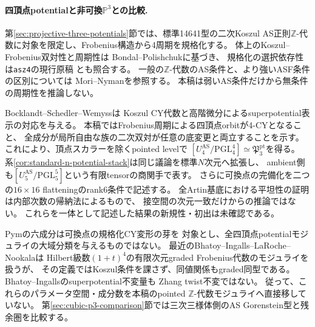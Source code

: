 \documentclass[11pt,a4paper]{ltjsarticle}
\numberwithin{equation}{section}
\newcommand{\PP}{\mathbb P}
\newcommand{\PGL}{\mathrm{PGL}}
\begin{document}
\paragraph{四頂点potentialと非可換$\PP^3$との比較.}
第\ref{sec:projective-three-potentials}節では、標準14641型の二次Koszul
AS正則$\mathbb Z$-代数に対象を限定し、Frobenius構造から4周期を規格化する。
体上のKoszul--Frobenius双対性と周期性は
Bondal--Polishchuk\cite{PBondalPolishchukHelices}に基づき、
規格化の選択依存性は\texttt{asz4}の現行原稿
\cite{ASZ4Canonical}とも照合する。
一般の$\mathbb Z$-代数のAS条件と、より強いASF条件の区別については
Mori--Nyman\cite[Theorem~4.19 and Lemma~5.24]{MoriNymanZ}を参照する。
本稿は弱いAS条件だけから無条件の周期性を推論しない。

Bocklandt--Schedler--Wemyss\cite[Theorem~6.2]{BSWPotentials}は
Koszul CY代数と高階微分によるsuperpotential表示の対応を与える。
本稿ではFrobenius周期による四頂点orbitが4-CYとなること、
全成分が局所自由な族の二次双対が任意の底変更と両立することを示す。
これにより、頂点スカラーを除くpointed levelで
$[U_4^{\mathrm{AS}}/\PGL_4^4]\simeq\mathfrak P_3^{\mathrm{pt}}$を得る。
系\ref{cor:standard-n-potential-stack}は同じ議論を標準$N$次元へ拡張し、
ambient側も$[U_5^{\mathrm{AS}}/\PGL_5^5]$という有限tensorの商関手で表す。
さらに可換点の完備化を二つの$16\times16$ flatteningのrank6条件で記述する。
全Artin基底における平坦性の証明は内部次数の帰納法によるもので、
接空間の次元一致だけからの推論ではない。
これらを一体として記述した結果の新規性・初出は未確認である。

Pym\cite[Theorem~1.1 and \S2.2]{Pym}の六成分は可換点の規格化CY変形の芽を
対象とし、全四頂点potentialモジュライの大域分類を与えるものではない。
最近のBhatoy--Ingalls--LaRoche--Nookala\cite[\S2.3]{BILNComponents}は
Hilbert級数$(1+t)^4$の有限次元graded Frobenius代数のモジュライを扱うが、
その定義ではKoszul条件を課さず、同値関係もgraded同型である。
Bhatoy--Ingalls\cite[\S1]{BIDiscrete}のsuperpotential不変量も
Zhang twist不変ではない。
従って、これらのパラメータ空間・成分数を本稿のpointed
$\mathbb Z$-代数モジュライへ直接移していない。
第\ref{sec:cubic-p3-comparison}節では三次三様体側のAS Gorenstein型と残余圏を比較する。
\end{document}
